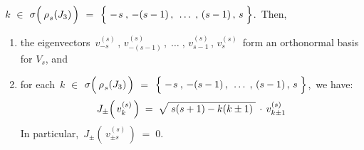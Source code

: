 \begin{theorem}
\begin{enumerate}
	\,$k$ $\in$ $\sigma\!\left(\,\overset{{\color{white}-}}{\rho}_{s}(J_{3})\,\right)$
	$=$ $\left\{\;-\overset{{\color{white}-}}{s} \,,\, -(s-1) \,,\, \;\ldots\;,\, (s-1) \,,\, s\;\right\}$.\,
	Then, 
	\begin{enumerate}
	\item
		the eigenvectors
		\,$v^{(s)}_{-s} \,,\, v^{(s)}_{-(s-1)} \,,\; \ldots \;,\, v^{(s)}_{s-1} \,,\, v^{(s)}_{s}$\,
		form an orthonormal basis for $V_{s}$, and
	\item
		for each \,$k$ $\in$ $\sigma\!\left(\,\overset{{\color{white}-}}{\rho}_{s}(J_{3})\,\right)$
		$=$ $\left\{\;-\overset{{\color{white}-}}{s} \,,\, -(s-1) \,,\, \;\ldots\;,\, (s-1) \,,\, s\;\right\}$,\,
		we have:
		\begin{equation*}
		J_{\pm}\!\left(\,v^{(s)}_{k}\,\right)
		\; = \;
			\sqrt{{\color{white}.}
			s(s+1) - k(k \pm 1)
			{\color{white}.}}
			\,\cdot\,
			v^{(s)}_{k \pm 1}
		\end{equation*}
		In particular, \,$J_{\pm}\!\left(\,v^{(s)}_{\pm s}\,\right) \; = \; 0$.
	\end{enumerate}
\end{enumerate}
\end{theorem}


